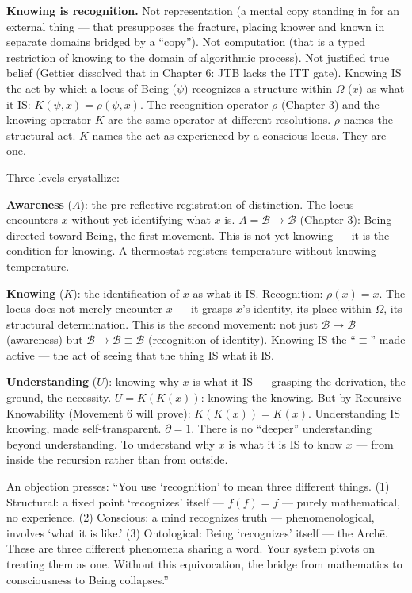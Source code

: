 \documentclass[10pt, openany, oneside]{book}
\begin{document}
\textbf{Knowing is recognition.} Not representation (a mental copy standing in for an external thing --- that presupposes the fracture, placing knower and known in separate domains bridged by a ``copy''). Not computation (that is a typed restriction of knowing to the domain of algorithmic process). Not justified true belief (Gettier dissolved that in Chapter 6: JTB lacks the ITT gate). Knowing IS the act by which a locus of Being ($\psi$) recognizes a structure within $\Omega$ ($x$) as what it IS: $K(\psi, x) = \rho(\psi, x)$. The recognition operator $\rho$ (Chapter 3) and the knowing operator $K$ are the same operator at different resolutions. $\rho$ names the structural act. $K$ names the act as experienced by a conscious locus. They are one.

Three levels crystallize:

\textbf{Awareness} ($A$): the pre-reflective registration of distinction. The locus encounters $x$ without yet identifying what $x$ is. $A = \mathcal{B} \to \mathcal{B}$ (Chapter 3): Being directed toward Being, the first movement. This is not yet knowing --- it is the condition for knowing. A thermostat registers temperature without knowing temperature.

\textbf{Knowing} ($K$): the identification of $x$ as what it IS. Recognition: $\rho(x) = x$. The locus does not merely encounter $x$ --- it grasps $x$'s identity, its place within $\Omega$, its structural determination. This is the second movement: not just $\mathcal{B} \to \mathcal{B}$ (awareness) but $\mathcal{B} \to \mathcal{B} \equiv \mathcal{B}$ (recognition of identity). Knowing IS the ``$\equiv$'' made active --- the act of seeing that the thing IS what it IS.

\textbf{Understanding} ($U$): knowing why $x$ is what it IS --- grasping the derivation, the ground, the necessity. $U = K(K(x))$: knowing the knowing. But by Recursive Knowability (Movement 6 will prove): $K(K(x)) = K(x)$. Understanding IS knowing, made self-transparent. $\partial = 1$. There is no ``deeper'' understanding beyond understanding. To understand why $x$ is what it is IS to know $x$ --- from inside the recursion rather than from outside.

An objection presses: ``You use `recognition' to mean three different things. (1) Structural: a fixed point `recognizes' itself --- $f(f) = f$ --- purely mathematical, no experience. (2) Conscious: a mind recognizes truth --- phenomenological, involves `what it is like.' (3) Ontological: Being `recognizes' itself --- the Arch\={e}. These are three different phenomena sharing a word. Your system pivots on treating them as one. Without this equivocation, the bridge from mathematics to consciousness to Being collapses.''
\end{document}
